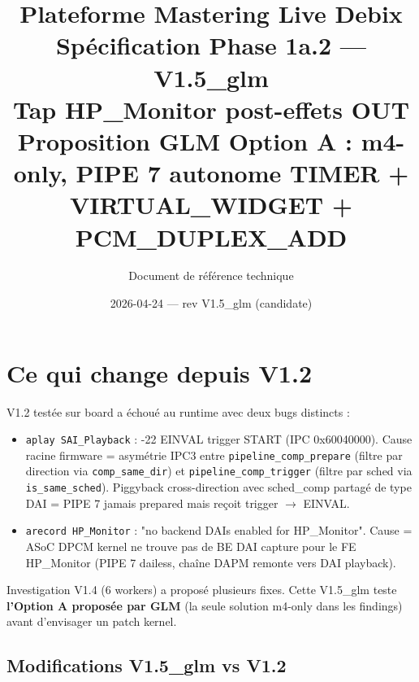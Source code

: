 \documentclass[11pt,a4paper]{article}
\title{\textbf{Plateforme Mastering Live Debix}\\[6pt]
  \Large Spécification Phase 1a.2 --- \textbf{V1.5\_glm}\\[4pt]
  \large Tap HP\_Monitor post-effets OUT\\
  \normalsize Proposition GLM Option A : m4-only, PIPE 7 autonome TIMER + VIRTUAL\_WIDGET + PCM\_DUPLEX\_ADD}
\author{Document de référence technique}
\date{2026-04-24 --- rev V1.5\_glm (candidate)}
\begin{document}
\maketitle
\tableofcontents
\clearpage

\section{Ce qui change depuis V1.2}

V1.2 testée sur board a échoué au runtime avec deux bugs distincts :
\begin{itemize}[leftmargin=*, itemsep=1pt]
  \item \texttt{aplay SAI\_Playback} : -22 EINVAL trigger START (IPC 0x60040000). Cause racine firmware = asymétrie IPC3 entre \texttt{pipeline\_comp\_prepare} (filtre par direction via \texttt{comp\_same\_dir}) et \texttt{pipeline\_comp\_trigger} (filtre par sched via \texttt{is\_same\_sched}). Piggyback cross-direction avec sched\_comp partagé de type DAI = PIPE 7 jamais prepared mais reçoit trigger $\to$ EINVAL.
  \item \texttt{arecord HP\_Monitor} : "no backend DAIs enabled for HP\_Monitor". Cause = ASoC DPCM kernel ne trouve pas de BE DAI capture pour le FE HP\_Monitor (PIPE 7 dailess, chaîne DAPM remonte vers DAI playback).
\end{itemize}

Investigation V1.4 (6 workers) a proposé plusieurs fixes. Cette V1.5\_glm teste \textbf{l'Option A proposée par GLM} (la seule solution m4-only dans les findings) avant d'envisager un patch kernel.

\subsection{Modifications V1.5\_glm vs V1.2}
\end{document}
